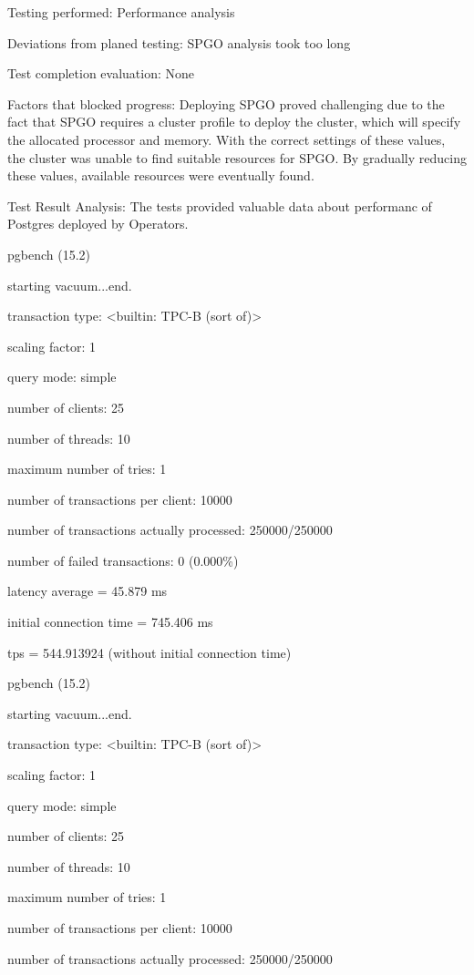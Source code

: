Testing performed: Performance analysis

Deviations from planed testing: SPGO analysis took too long

Test completion evaluation: None

Factors that blocked progress: Deploying SPGO proved challenging due to the fact that SPGO requires a cluster profile to deploy the cluster, which will specify the allocated processor and memory. With the correct settings of these values, the cluster was unable to find suitable resources for SPGO. By gradually reducing these values, available resources were eventually found.

Test Result Analysis: The tests provided valuable data about performanc of Postgres deployed by Operators.

pgbench (15.2)

starting vacuum...end.

transaction type: <builtin: TPC-B (sort of)>

scaling factor: 1

query mode: simple

number of clients: 25

number of threads: 10

maximum number of tries: 1

number of transactions per client: 10000

number of transactions actually processed: 250000/250000

number of failed transactions: 0 (0.000\%)

latency average = 45.879 ms

initial connection time = 745.406 ms

tps = 544.913924 (without initial connection time)

pgbench (15.2)

starting vacuum...end.

transaction type: <builtin: TPC-B (sort of)>

scaling factor: 1

query mode: simple

number of clients: 25

number of threads: 10

maximum number of tries: 1

number of transactions per client: 10000

number of transactions actually processed: 250000/250000

